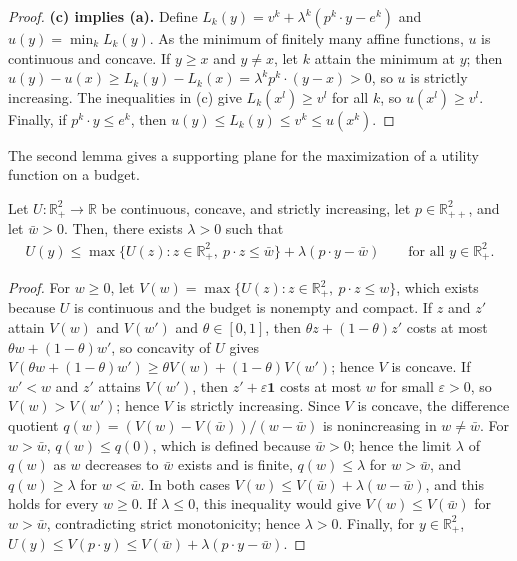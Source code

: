 \documentclass[11 pt]{article}
\begin{document}
\begin{proof}
\textbf{(c) implies (a).} Define $L_{k}(y) = v^{k} + \lambda^{k} (p^{k} \cdot y - e^{k})$ and $u(y) = \min_{k} L_{k}(y)$. As the minimum of finitely many affine functions, $u$ is continuous and concave. If $y \geq x$ and $y \neq x$, let $k$ attain the minimum at $y$; then $u(y) - u(x) \geq L_{k}(y) - L_{k}(x) = \lambda^{k} p^{k} \cdot (y - x) > 0$, so $u$ is strictly increasing. The inequalities in (c) give $L_{k}(x^{l}) \geq v^{l}$ for all $k$, so $u(x^{l}) \geq v^{l}$. Finally, if $p^{k} \cdot y \leq e^{k}$, then $u(y) \leq L_{k}(y) \leq v^{k} \leq u(x^{k})$.
\end{proof}

The second lemma gives a supporting plane for the maximization of a utility function on a budget.

\begin{lemma}\label{lem:app_support}
Let $U : \mathbb{R}^{2}_{+} \to \mathbb{R}$ be continuous, concave, and strictly increasing, let $p \in \mathbb{R}^{2}_{++}$, and let $\bar w > 0$. Then, there exists $\lambda > 0$ such that
\begin{align}\label{eqn:app_support}
U(y) \leq \max \bigl\{ U(z) : z \in \mathbb{R}^{2}_{+},\ p \cdot z \leq \bar w \bigr\} + \lambda (p \cdot y - \bar w) \qquad \text{for all } y \in \mathbb{R}^{2}_{+}.
\end{align}
\end{lemma}

\begin{proof}
For $w \geq 0$, let $V(w) = \max \{ U(z) : z \in \mathbb{R}^{2}_{+},\ p \cdot z \leq w \}$, which exists because $U$ is continuous and the budget is nonempty and compact. If $z$ and $z'$ attain $V(w)$ and $V(w')$ and $\theta \in [0,1]$, then $\theta z + (1-\theta) z'$ costs at most $\theta w + (1-\theta) w'$, so concavity of $U$ gives $V(\theta w + (1-\theta) w') \geq \theta V(w) + (1-\theta) V(w')$; hence $V$ is concave. If $w' < w$ and $z'$ attains $V(w')$, then $z' + \varepsilon \mathbf{1}$ costs at most $w$ for small $\varepsilon > 0$, so $V(w) > V(w')$; hence $V$ is strictly increasing. Since $V$ is concave, the difference quotient $q(w) = (V(w) - V(\bar w))/(w - \bar w)$ is nonincreasing in $w \neq \bar w$. For $w > \bar w$, $q(w) \leq q(0)$, which is defined because $\bar w > 0$; hence the limit $\lambda$ of $q(w)$ as $w$ decreases to $\bar w$ exists and is finite, $q(w) \leq \lambda$ for $w > \bar w$, and $q(w) \geq \lambda$ for $w < \bar w$. In both cases $V(w) \leq V(\bar w) + \lambda (w - \bar w)$, and this holds for every $w \geq 0$. If $\lambda \leq 0$, this inequality would give $V(w) \leq V(\bar w)$ for $w > \bar w$, contradicting strict monotonicity; hence $\lambda > 0$. Finally, for $y \in \mathbb{R}^{2}_{+}$, $U(y) \leq V(p \cdot y) \leq V(\bar w) + \lambda (p \cdot y - \bar w)$.
\end{proof}
\end{document}
